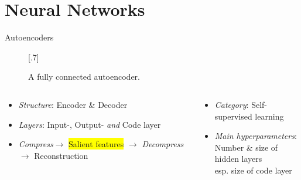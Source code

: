 \documentclass[usenames,dvipsnames,Nike,mathserif]{tuberlinbeamer}
\begin{document}
\section{Neural Networks}

\begin{frame}[fragile]{Autoencoders}
	\begin{figure}
		\scalebox{.7}[.7]{}
		\caption{A fully connected autoencoder.}
	\end{figure}
	\vspace{-3em}
	\begin{columns}
		\begin{column}{.5\textwidth}
			\begin{itemize}
				\item <2->\emph{Structure}: Encoder \& Decoder
				\item <3->\emph{Layers}: Input-, Output- \emph{and} Code layer
				\item <4->\emph{Compress}$\rightarrow$ \colorbox{yellow}{Salient features} $\rightarrow$ \emph{Decompress} $\rightarrow$ Reconstruction
			\end{itemize}
		\end{column}
		\begin{column}{.5\textwidth}
			\begin{itemize}
				\item <5->\emph{Category}: Self-supervised learning
				\item <6->\emph{Main hyperparameters}:\\
					 	Number \& size of hidden layers\\
					 	esp. size of code layer
			\end{itemize}
		\end{column}
	\end{columns}
\end{frame}
\end{document}
